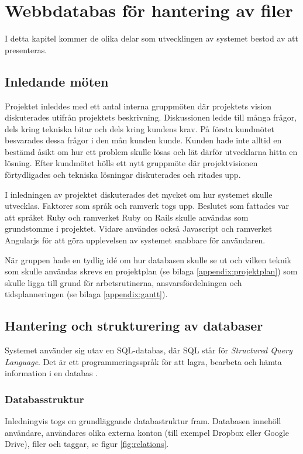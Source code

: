 \chapter{Webbdatabas för hantering av filer}
I detta kapitel kommer de olika delar som utvecklingen av systemet bestod av att presenteras.

\section{Inledande möten}
Projektet inleddes med ett antal interna gruppmöten där projektets vision diskuterades utifrån projektets beskrivning. Diskussionen ledde till många frågor, dels kring tekniska bitar och dels kring kundens krav. På första kundmötet besvarades dessa frågor i den mån kunden kunde. Kunden hade inte alltid en bestämd åsikt om hur ett problem skulle lösas och lät därför utvecklarna hitta en lösning. Efter kundmötet hölls ett nytt gruppmöte där projektvisionen förtydligades och tekniska lösningar diskuterades och ritades upp.

I inledningen av projektet diskuterades det mycket om hur systemet skulle utvecklas. Faktorer som språk och ramverk togs upp. Beslutet som fattades var att språket Ruby och ramverket Ruby on Rails skulle användas som grundstomme i projektet. Vidare användes också Javascript och ramverket Angularjs för att göra upplevelsen av systemet snabbare för användaren.

När gruppen hade en tydlig idé om hur databasen skulle se ut och vilken teknik som skulle användas skrevs en projektplan (se bilaga \ref{appendix:projektplan}) som skulle ligga till grund för arbetsrutinerna, ansvarsfördelningen och tidsplanneringen (se bilaga \ref{appendix:gantt}).

\section{Hantering och strukturering av databaser}
Systemet använder sig utav en SQL-databas, där SQL står för \textit{Structured Query Language}. Det är ett programmeringsspråk för att lagra, bearbeta och hämta information i en databas \cite{sqlenc}.

\subsection{Databasstruktur}
Inledningvis togs en grundläggande databastruktur fram. Databasen innehöll användare, användares olika externa konton (till exempel Dropbox eller Google Drive), filer och taggar, se figur \ref{fig:relations}.

